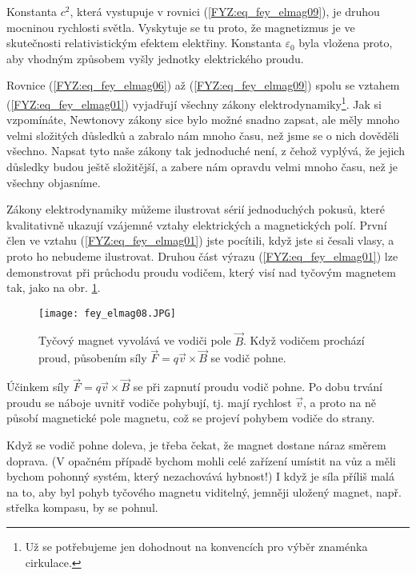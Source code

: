     Konstanta \(c^2\), která vystupuje v rovnici (\ref{FYZ:eq_fey_elmag09}), je druhou mocninou rychlosti 
    světla. Vyskytuje se tu proto, že magnetizmus je ve skutečnosti relativistickým efektem elektřiny. 
    Konstanta \(\varepsilon_0\) byla vložena proto, aby vhodným způsobem vyšly jednotky elektrického 
    proudu.        
    
    Rovnice (\ref{FYZ:eq_fey_elmag06}) až (\ref{FYZ:eq_fey_elmag09}) spolu se vztahem    
    (\ref{FYZ:eq_fey_elmag01}) vyjadřují všechny zákony elektrodynamiky\footnote{Už se potřebujeme jen 
    dohodnout na konvencích pro výběr znaménka cirkulace.}. Jak si vzpomínáte, Newtonovy zákony sice bylo 
    možné snadno zapsat, ale měly mnoho velmi složitých důsledků a zabralo nám mnoho času, než jsme se o 
    nich dověděli všechno. Napsat tyto naše zákony tak jednoduché není, z čehož vyplývá, že jejich důsledky 
    budou ještě složitější, a zabere nám opravdu velmi mnoho času, než je všechny objasníme.     
    
    Zákony elektrodynamiky můžeme ilustrovat sérií jednoduchých pokusů, které kvalitativně ukazují vzájemné 
    vztahy elektrických a magnetických polí. První člen ve vztahu (\ref{FYZ:eq_fey_elmag01}) jste pocítili, 
    když jste si česali vlasy, a proto ho nebudeme ilustrovat. Druhou část výrazu 
    (\ref{FYZ:eq_fey_elmag01}) lze demonstrovat při průchodu proudu vodičem, který visí nad tyčovým 
    magnetem tak, jako na obr. \ref{fyz:fig_fey_elmag08}.

    \begin{figure}[hb!]
      \texttt{[image: fey\_elmag08.JPG]}
      \caption{Tyčový magnet vyvolává ve vodiči pole \(\vec{B}\). Když vodičem prochází proud,     
                 působením síly \(\vec{F} = q\vec{v}\times\vec{B}\) se vodič pohne.}
      \label{fyz:fig_fey_elmag08}
    \end{figure}
    
    Účinkem síly \(\vec{F} = q\vec{v}\times\vec{B}\) se při zapnutí proudu vodič pohne. Po dobu trvání 
    proudu se náboje uvnitř vodiče pohybují, tj. mají rychlost \(\vec{v}\), a proto na ně působí magnetické 
    pole magnetu, což se projeví pohybem vodiče do strany.
    
    Když se vodič pohne doleva, je třeba čekat, že magnet dostane náraz směrem doprava. (V opačném případě 
    bychom mohli celé zařízení umístit na vůz a měli bychom pohonný systém, který nezachovává hybnost!) I 
    když je síla příliš malá na to, aby byl pohyb tyčového magnetu viditelný, jemněji uložený magnet, např. 
    střelka kompasu, by se pohnul.
    
